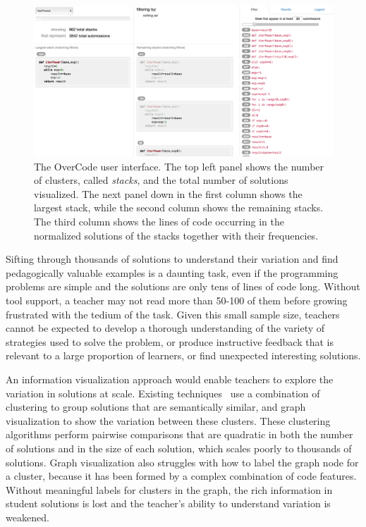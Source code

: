\begin{figure}[t!]
\centering
\includegraphics[width=1.0\linewidth]{Body/figures/overcode/interfaceScreenShot.png}
\caption{The OverCode user interface. The top left panel shows the number of clusters, called {\it stacks}, and the total number of solutions visualized. The next panel down in the first column shows the largest stack, while the second column shows the remaining stacks. The third column shows the lines of code occurring in the normalized solutions of the stacks together with their frequencies.}
\label{overcode_fullinterface}
\end{figure}

Sifting through thousands of solutions to understand their variation and find pedagogically valuable examples is a daunting task, even if the programming problems are simple and the solutions are only tens of lines of code long. Without tool support, a teacher may not read more than 50-100 of them before growing frustrated with the tedium of the task. Given this small sample size, teachers cannot be expected to develop a thorough understanding of the variety of strategies used to solve the problem, or produce instructive feedback that is relevant to a large proportion of learners, or find unexpected interesting solutions.

An information visualization approach would enable teachers to explore the variation in solutions at scale. Existing techniques~\cite{gradingsigcse14,MOOCshop,codewebs} use a combination of clustering to group solutions that are semantically similar, and graph visualization to show the variation between these clusters. These clustering algorithms perform pairwise comparisons that are quadratic in both the number of solutions and in the size of each solution, which scales poorly to thousands of solutions. Graph visualization also struggles with how to label the graph node for a cluster, because it has been formed by a complex combination of code features. Without meaningful labels for clusters in the graph, the rich information in student solutions is lost and the teacher's ability to understand variation is weakened.

